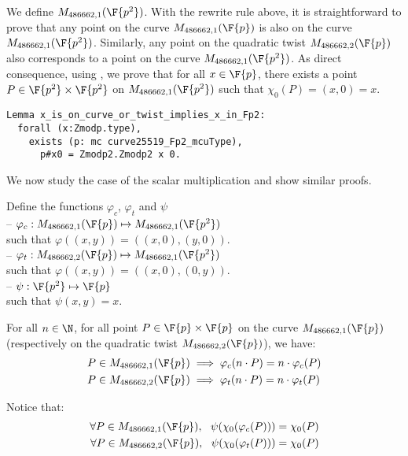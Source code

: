 We define $M_{486662,1}(\F{p^2})$. With the rewrite rule above, it is straightforward
to prove that any point on the curve $M_{486662,1}(\F{p})$ is also on the curve
$M_{486662,1}(\F{p^2})$. Similarly, any point on the quadratic twist
$M_{486662,2}(\F{p})$ also corresponds to a point on the curve $M_{486662,1}(\F{p^2})$.
As direct consequence, using , we prove that for all
$x \in \F{p}$, there exists a point $P \in \F{p^2}\times\F{p^2}$ on
$M_{486662,1}(\F{p^2})$ such that $\chi_0(P) = (x,0) = x$.

\begin{lstlisting}[language=Coq,belowskip=-0.25 \baselineskip]
Lemma x_is_on_curve_or_twist_implies_x_in_Fp2:
  forall (x:Zmodp.type),
    exists (p: mc curve25519_Fp2_mcuType),
      p#x0 = Zmodp2.Zmodp2 x 0.
\end{lstlisting}

We now study the case of the scalar multiplication and show similar proofs.
\begin{dfn}
  Define the functions $\varphi_c$, $\varphi_t$ and $\psi$\\
  -- $\varphi_c: M_{486662,1}(\F{p}) \mapsto M_{486662,1}(\F{p^2})$\\
  such that $\varphi((x,y)) = ((x,0), (y,0))$.\\
  -- $\varphi_t: M_{486662,2}(\F{p}) \mapsto M_{486662,1}(\F{p^2})$\\
  such that $\varphi((x,y)) = ((x,0), (0,y))$.\\
  -- $\psi: \F{p^2} \mapsto \F{p}$\\
  such that $\psi(x,y) = x$.
\end{dfn}

\begin{lemma}
  \label{lemma:proj}
  For all $n \in \N$, for all point $P\in\F{p}\times\F{p}$ on the curve
  $M_{486662,1}(\F{p})$ (respectively on the quadratic twist $M_{486662,2}(\F{p})$), we have:
  \begin{align*}
    P \in M_{486662,1}(\F{p}) & \implies \varphi_c(n \cdot P) = n \cdot \varphi_c(P) \\
    P \in M_{486662,2}(\F{p}) & \implies \varphi_t(n \cdot P) = n \cdot \varphi_t(P)
  \end{align*}
\end{lemma}
Notice that:
\begin{align*}
  \forall P \in M_{486662,1}(\F{p}),\ \ \psi(\chi_0(\varphi_c(P))) = \chi_0(P) \\
  \forall P \in M_{486662,2}(\F{p}),\ \ \psi(\chi_0(\varphi_t(P))) = \chi_0(P)
\end{align*}

